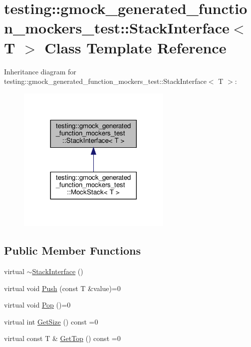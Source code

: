 \hypertarget{classtesting_1_1gmock__generated__function__mockers__test_1_1_stack_interface}{}\section{testing\+:\+:gmock\+\_\+generated\+\_\+function\+\_\+mockers\+\_\+test\+:\+:Stack\+Interface$<$ T $>$ Class Template Reference}
\label{classtesting_1_1gmock__generated__function__mockers__test_1_1_stack_interface}


Inheritance diagram for testing\+:\+:gmock\+\_\+generated\+\_\+function\+\_\+mockers\+\_\+test\+:\+:Stack\+Interface$<$ T $>$\+:
\nopagebreak
\begin{figure}[H]
\begin{center}
\leavevmode
\includegraphics[width=209pt]{classtesting_1_1gmock__generated__function__mockers__test_1_1_stack_interface__inherit__graph}
\end{center}
\end{figure}
\subsection*{Public Member Functions}
\begin{DoxyCompactItemize}
\item 
virtual \hyperlink{classtesting_1_1gmock__generated__function__mockers__test_1_1_stack_interface_a87b83db3e9cb1c986d6b0649b37cfa7c}{$\sim$\+Stack\+Interface} ()
\item 
virtual void \hyperlink{classtesting_1_1gmock__generated__function__mockers__test_1_1_stack_interface_a49448f6195021fee947d37b80b6e5d30}{Push} (const T \&value)=0
\item 
virtual void \hyperlink{classtesting_1_1gmock__generated__function__mockers__test_1_1_stack_interface_a1a6646d1d9febe90c607b9b3e4539b67}{Pop} ()=0
\item 
virtual int \hyperlink{classtesting_1_1gmock__generated__function__mockers__test_1_1_stack_interface_a537ec8647a2333f50e5f923a85b90eba}{Get\+Size} () const =0
\item 
virtual const T \& \hyperlink{classtesting_1_1gmock__generated__function__mockers__test_1_1_stack_interface_af36e32b9ae568100363466d1ebf95364}{Get\+Top} () const =0
\end{DoxyCompactItemize}


